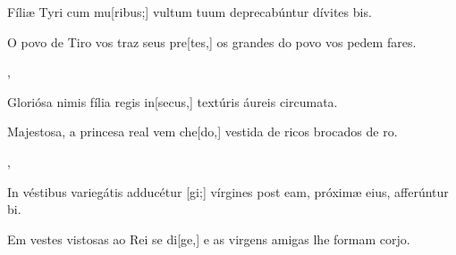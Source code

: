 {    {\item {}Fíliæ Tyri cum mu[ribus;] vultum tuum deprecabúntur dívites bis.}%
        {\item {}O povo de Tiro vos traz seus pre[tes,] os grandes do povo vos pedem fares.},
    {\item {}Gloriósa nimis fília regis in[secus,] textúris áureis circumata.}%
        {\item {}Majestosa, a princesa real vem che[do,] vestida de ricos brocados de ro.},
    {\item {}In véstibus variegátis adducétur [gi;] vírgines post eam, próximæ eius, afferúntur bi.}%
        {\item {}Em vestes vistosas ao Rei se di[ge,] e as virgens amigas lhe formam corjo.}
}